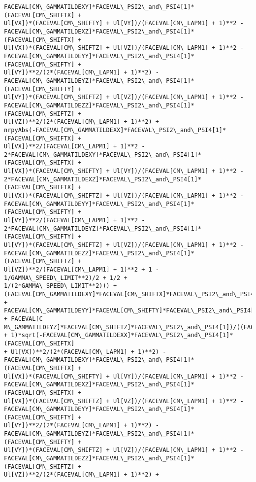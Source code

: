 \documentclass[landscape,letterpaper,10pt,english]{article}
\begin{document}
\begin{Verbatim}[commandchars=\\\{\}]
FACEVAL[CM\_GAMMATILDEXY]*FACEVAL\_PSI2\_and\_PSI4[1]*(FACEVAL[CM\_SHIFTX] +
Ul[VX])*(FACEVAL[CM\_SHIFTY] + Ul[VY])/(FACEVAL[CM\_LAPM1] + 1)**2 -
FACEVAL[CM\_GAMMATILDEXZ]*FACEVAL\_PSI2\_and\_PSI4[1]*(FACEVAL[CM\_SHIFTX] +
Ul[VX])*(FACEVAL[CM\_SHIFTZ] + Ul[VZ])/(FACEVAL[CM\_LAPM1] + 1)**2 -
FACEVAL[CM\_GAMMATILDEYY]*FACEVAL\_PSI2\_and\_PSI4[1]*(FACEVAL[CM\_SHIFTY] +
Ul[VY])**2/(2*(FACEVAL[CM\_LAPM1] + 1)**2) -
FACEVAL[CM\_GAMMATILDEYZ]*FACEVAL\_PSI2\_and\_PSI4[1]*(FACEVAL[CM\_SHIFTY] +
Ul[VY])*(FACEVAL[CM\_SHIFTZ] + Ul[VZ])/(FACEVAL[CM\_LAPM1] + 1)**2 -
FACEVAL[CM\_GAMMATILDEZZ]*FACEVAL\_PSI2\_and\_PSI4[1]*(FACEVAL[CM\_SHIFTZ] +
Ul[VZ])**2/(2*(FACEVAL[CM\_LAPM1] + 1)**2) +
nrpyAbs(-FACEVAL[CM\_GAMMATILDEXX]*FACEVAL\_PSI2\_and\_PSI4[1]*(FACEVAL[CM\_SHIFTX] +
Ul[VX])**2/(FACEVAL[CM\_LAPM1] + 1)**2 -
2*FACEVAL[CM\_GAMMATILDEXY]*FACEVAL\_PSI2\_and\_PSI4[1]*(FACEVAL[CM\_SHIFTX] +
Ul[VX])*(FACEVAL[CM\_SHIFTY] + Ul[VY])/(FACEVAL[CM\_LAPM1] + 1)**2 -
2*FACEVAL[CM\_GAMMATILDEXZ]*FACEVAL\_PSI2\_and\_PSI4[1]*(FACEVAL[CM\_SHIFTX] +
Ul[VX])*(FACEVAL[CM\_SHIFTZ] + Ul[VZ])/(FACEVAL[CM\_LAPM1] + 1)**2 -
FACEVAL[CM\_GAMMATILDEYY]*FACEVAL\_PSI2\_and\_PSI4[1]*(FACEVAL[CM\_SHIFTY] +
Ul[VY])**2/(FACEVAL[CM\_LAPM1] + 1)**2 -
2*FACEVAL[CM\_GAMMATILDEYZ]*FACEVAL\_PSI2\_and\_PSI4[1]*(FACEVAL[CM\_SHIFTY] +
Ul[VY])*(FACEVAL[CM\_SHIFTZ] + Ul[VZ])/(FACEVAL[CM\_LAPM1] + 1)**2 -
FACEVAL[CM\_GAMMATILDEZZ]*FACEVAL\_PSI2\_and\_PSI4[1]*(FACEVAL[CM\_SHIFTZ] +
Ul[VZ])**2/(FACEVAL[CM\_LAPM1] + 1)**2 + 1 - 1/GAMMA\_SPEED\_LIMIT**2)/2 + 1/2 +
1/(2*GAMMA\_SPEED\_LIMIT**2))) +
(FACEVAL[CM\_GAMMATILDEXY]*FACEVAL[CM\_SHIFTX]*FACEVAL\_PSI2\_and\_PSI4[1] +
FACEVAL[CM\_GAMMATILDEYY]*FACEVAL[CM\_SHIFTY]*FACEVAL\_PSI2\_and\_PSI4[1] + FACEVAL[C
M\_GAMMATILDEYZ]*FACEVAL[CM\_SHIFTZ]*FACEVAL\_PSI2\_and\_PSI4[1])/((FACEVAL[CM\_LAPM1]
+ 1)*sqrt(-FACEVAL[CM\_GAMMATILDEXX]*FACEVAL\_PSI2\_and\_PSI4[1]*(FACEVAL[CM\_SHIFTX]
+ Ul[VX])**2/(2*(FACEVAL[CM\_LAPM1] + 1)**2) -
FACEVAL[CM\_GAMMATILDEXY]*FACEVAL\_PSI2\_and\_PSI4[1]*(FACEVAL[CM\_SHIFTX] +
Ul[VX])*(FACEVAL[CM\_SHIFTY] + Ul[VY])/(FACEVAL[CM\_LAPM1] + 1)**2 -
FACEVAL[CM\_GAMMATILDEXZ]*FACEVAL\_PSI2\_and\_PSI4[1]*(FACEVAL[CM\_SHIFTX] +
Ul[VX])*(FACEVAL[CM\_SHIFTZ] + Ul[VZ])/(FACEVAL[CM\_LAPM1] + 1)**2 -
FACEVAL[CM\_GAMMATILDEYY]*FACEVAL\_PSI2\_and\_PSI4[1]*(FACEVAL[CM\_SHIFTY] +
Ul[VY])**2/(2*(FACEVAL[CM\_LAPM1] + 1)**2) -
FACEVAL[CM\_GAMMATILDEYZ]*FACEVAL\_PSI2\_and\_PSI4[1]*(FACEVAL[CM\_SHIFTY] +
Ul[VY])*(FACEVAL[CM\_SHIFTZ] + Ul[VZ])/(FACEVAL[CM\_LAPM1] + 1)**2 -
FACEVAL[CM\_GAMMATILDEZZ]*FACEVAL\_PSI2\_and\_PSI4[1]*(FACEVAL[CM\_SHIFTZ] +
Ul[VZ])**2/(2*(FACEVAL[CM\_LAPM1] + 1)**2) +

\end{Verbatim}
\end{document}

